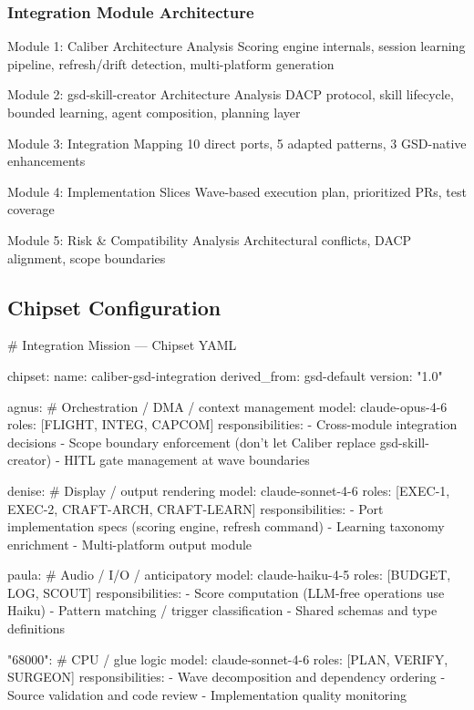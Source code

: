 \documentclass[11pt,letterpaper]{article}
\begin{document}
\subsubsection{Integration Module Architecture}

\begin{asciibox}
  Module 1: Caliber Architecture Analysis
    Scoring engine internals, session learning pipeline,
    refresh/drift detection, multi-platform generation

  Module 2: gsd-skill-creator Architecture Analysis
    DACP protocol, skill lifecycle, bounded learning,
    agent composition, planning layer

  Module 3: Integration Mapping
    10 direct ports, 5 adapted patterns, 3 GSD-native enhancements

  Module 4: Implementation Slices
    Wave-based execution plan, prioritized PRs, test coverage

  Module 5: Risk \& Compatibility Analysis
    Architectural conflicts, DACP alignment, scope boundaries
\end{asciibox}

\subsection{Chipset Configuration}

\begin{asciibox}
\# Integration Mission — Chipset YAML

chipset:
  name: caliber-gsd-integration
  derived\_from: gsd-default
  version: "1.0"

  agnus:                              \# Orchestration / DMA / context management
    model: claude-opus-4-6
    roles: [FLIGHT, INTEG, CAPCOM]
    responsibilities:
      - Cross-module integration decisions
      - Scope boundary enforcement (don't let Caliber replace gsd-skill-creator)
      - HITL gate management at wave boundaries

  denise:                             \# Display / output rendering
    model: claude-sonnet-4-6
    roles: [EXEC-1, EXEC-2, CRAFT-ARCH, CRAFT-LEARN]
    responsibilities:
      - Port implementation specs (scoring engine, refresh command)
      - Learning taxonomy enrichment
      - Multi-platform output module

  paula:                              \# Audio / I/O / anticipatory
    model: claude-haiku-4-5
    roles: [BUDGET, LOG, SCOUT]
    responsibilities:
      - Score computation (LLM-free operations use Haiku)
      - Pattern matching / trigger classification
      - Shared schemas and type definitions

  "68000":                            \# CPU / glue logic
    model: claude-sonnet-4-6
    roles: [PLAN, VERIFY, SURGEON]
    responsibilities:
      - Wave decomposition and dependency ordering
      - Source validation and code review
      - Implementation quality monitoring
\end{asciibox}
\end{document}
